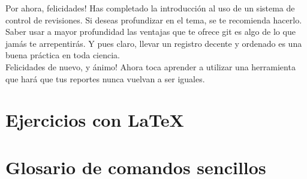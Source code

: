 \documentclass[10pt,letterpaper]{article}
\begin{document}
Por ahora, felicidades! Has completado la introducci\'on al uso de un sistema de control de revisiones. Si deseas profundizar en el tema, se te recomienda hacerlo. Saber usar a mayor profundidad las ventajas que te ofrece git es algo de lo que jam\'as te arrepentir\'as. Y pues claro, llevar un registro decente y ordenado es una buena pr\'actica en toda ciencia.\\

Felicidades de nuevo, y \'animo! Ahora toca aprender a utilizar una herramienta que har\'a que tus reportes nunca vuelvan a ser iguales.

\section{Ejercicios con \LaTeX\ }

\section{Glosario de comandos sencillos}
\end{document}
